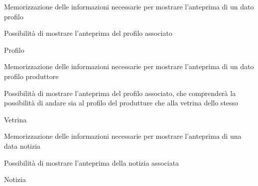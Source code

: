 
{\begin{itemWork}
	\item Memorizzazione delle informazioni necessarie per mostrare l'anteprima di un dato profilo
	\item Possibilità di mostrare l'anteprima del profilo associato
\end{itemWork}}
{\begin{itemWork}
	\item Profilo
\end{itemWork}}


{\begin{itemWork}
	\item Memorizzazione delle informazioni necessarie per mostrare l'anteprima di un dato profilo produttore
	\item Possibilità di mostrare l'anteprima del profilo associato, che comprenderà la possibilità di andare sia al profilo del produtture che alla vetrina dello stesso
\end{itemWork}}
{\begin{itemWork}
	\item Vetrina
\end{itemWork}}


{\begin{itemWork}
	\item Memorizzazione delle informazioni necessarie per mostrare l'anteprima di una data notizia
	\item Possibilità di mostrare l'anteprima della notizia associata
\end{itemWork}}
{\begin{itemWork}
	\item Notizia
\end{itemWork}}


